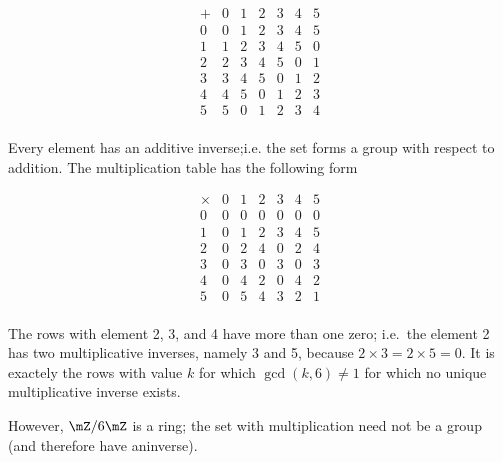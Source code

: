 \[
\begin{array}{c|cccccc}
+  & 0 & 1 & 2 & 3 & 4 & 5 \\
\hline
0  & 0 & 1 & 2 & 3 & 4 & 5 \\
1  & 1 & 2 & 3 & 4 & 5 & 0 \\
2  & 2 & 3 & 4 & 5 & 0 & 1 \\
3  & 3 & 4 & 5 & 0 & 1 & 2 \\
4  & 4 & 5 & 0 & 1 & 2 & 3 \\
5  & 5 & 0 & 1 & 2 & 3 & 4 \\
\end{array}
\]

Every element has an additive inverse;i.e. the set forms a group with respect to addition. The multiplication table has the following form

\[
\begin{array}{c|cccccc}
\times  & 0 & 1 & 2 & 3 & 4 & 5 \\
\hline
     0  & 0 & 0 & 0 & 0 & 0 & 0 \\
     1  & 0 & 1 & 2 & 3 & 4 & 5 \\
     2  & 0 & 2 & 4 & 0 & 2 & 4 \\
     3  & 0 & 3 & 0 & 3 & 0 & 3 \\
     4  & 0 & 4 & 2 & 0 & 4 & 2 \\
     5  & 0 & 5 & 4 & 3 & 2 & 1 \\
\end{array}
\]

The rows with element 2, 3, and 4 have more than one zero; i.e.~the element 2 has two multiplicative inverses, namely 3 and 5, because \(2\times3=2\times5=0\). It is exactely the rows with value \(k\) for
which \(\gcd(k,6) \neq 1\) for which no unique multiplicative inverse exists.

However, $\mZ/6\mZ$ is a ring; the set with multiplication need not be a group (and therefore have aninverse).
